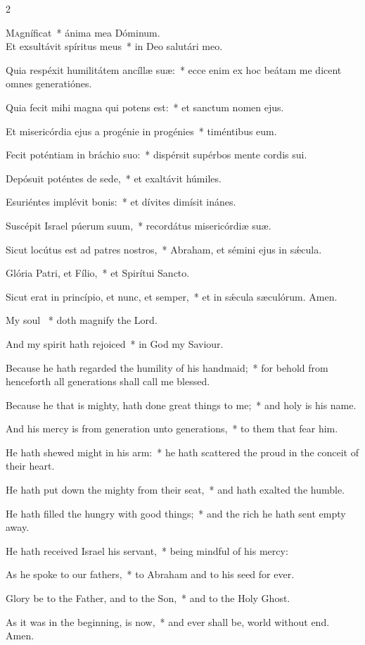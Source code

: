 \documentclass[12pt]{book}
\begin{document}
\begin{paracol}{2}

\lettrine{M}agníficat~* ánima mea Dóminum.\\ Et exsultávit spíritus meus~* in Deo salutári meo.

 Quia respéxit humilitátem ancíllæ suæ:~* ecce enim ex hoc beátam me dicent o\-mnes generatiónes.

 Quia fecit mihi magna qui potens est:~* et san\-ctum nomen ejus.

 Et misericórdia ejus a progénie in progénies~* timéntibus eum.

 Fecit poténtiam in bráchio suo:~* dispérsit supérbos mente cordis sui.

 Depósuit poténtes de sede,~* et exaltávit húmiles.

 Esuriéntes implévit bonis:~* et dívites dimísit inánes.

 Suscépit Israel púerum suum,~* recordátus misericórdiæ suæ.

 Sicut locútus est ad patres no\-stros,~* Abraham, et sémini ejus in sǽcula.

 Glória Patri, et Fílio,~* et Spirítui San\-cto.

 Sicut erat in princípio, et nunc, et semper,~* et in sǽcula sæculórum. Amen.
 
 \switchcolumn
 \begin{enpars}
My soul \cc~* doth magnify the Lord.

And my spirit hath rejoiced~* in God my Saviour.

Because he hath regarded the humility of his handmaid;~* for behold from henceforth all generations shall call me blessed.

Because he that is mighty, hath done great things to me;~* and holy is his name.

And his mercy is from generation unto generations,~* to them that fear him.

He hath shewed might in his arm:~* he hath scattered the proud in the conceit of their heart.

He hath put down the mighty from their seat,~* and hath exalted the humble.

He hath filled the hungry with good things;~* and the rich he hath sent empty away.

He hath received Israel his servant,~* being mindful of his mercy:

As he spoke to our fathers,~* to Abraham and to his seed for ever.

Glory be to the Father, and to the Son,~* and to the Holy Ghost.

As it was in the beginning, is now,~* and ever shall be, world without end. Amen.
\end{enpars}
\end{paracol}
\end{document}
